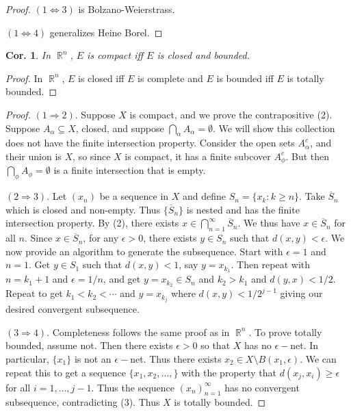 \documentclass[12pt, a4paper]{book}
\DeclareMathOperator{\R}{\mathbb{R}}
\newtheorem{corollary}[theorem]{Cor.}
\theoremstyle{nonumberplain}
\newtheorem{proof}{Proof}
\begin{document}
\begin{proof}
    $(1\Leftrightarrow 3)$ is Bolzano-Weierstrass.

    $(1\Leftrightarrow 4)$ generalizes Heine Borel.
\end{proof}
\begin{corollary}
    In $\R^n$, $E$ is compact iff $E$ is closed and bounded.
\end{corollary}
\begin{proof}
    In $\R^n$, $E$ is closed iff $E$ is complete and $E$ is bounded iff $E$ is totally bounded.
\end{proof}
\begin{proof}
    $(1\Rightarrow 2)$. Suppose $X$ is compact, and we prove the contrapositive (2).
    Suppose $A_\alpha\subseteq X$, closed, and suppose $\bigcap_{\alpha}A_\alpha=\emptyset$. We will
    show this collection does not have the finite intersection property. Consider the open sets $A_\alpha^c$, and their union is
    $X$, so since $X$ is compact, it has a finite subcover $A_\phi^c$. But then $\bigcap_\phi A_\phi=\emptyset$ is a finite
    intersection that is empty.

    $(2\Rightarrow 3)$. Let $(x_n)$ be a sequence in $X$ and define $S_n=\{x_k:k\geq n\}$. Take $\overline{S}_n$ which is closed
    and non-empty. Thus $\{\overline{S}_n\}$ is nested and has the finite intersection property. By (2), there exists
    $x\in\bigcap_{n=1}^\infty\overline{S}_n$. We thus have $x\in\overline{S}_n$ for all $n$. Since $x\in\overline{S}_n$,
    for any $\epsilon>0$, there exists $y\in S_n$ such that $d(x,y)<\epsilon$. We now provide an algorithm to generate the
    subsequence. Start with $\epsilon=1$ and $n=1$. Get $y\in S_1$ such that $d(x,y)<1$, say $y=x_{k_1}$.
    Then repeat with $n=k_1+1$ and $\epsilon=1/n$, and get $y=x_{k_2}\in S_n$ and $k_2>k_1$ and $d(y,x)<1/2$. Repeat to
    get $k_1<k_2<\cdots$ and $y=x_{k_j}$ where $d(x,y)<1/2^{j-1}$ giving our desired convergent subsequence.

    $(3\Rightarrow 4)$. Completeness follows the same proof as in $\R^n$. To prove totally bounded, assume not. Then there exists $\epsilon>0$ so
    that $X$ has no $\epsilon-$net. In particular, $\{x_1\}$ is not an $\epsilon-$net. Thus there exists $x_2\in X\setminus B(x_1,\epsilon)$.
    We can repeat this to get a sequence $\{x_1,x_2,\ldots,\}$ with the property that $d(x_j,x_i)\geq\epsilon$ for all $i=1,\ldots,j-1$.
    Thus the sequence $(x_n)_{n=1}^\infty$ has no convergent subsequence, contradicting (3). Thus $X$ is totally bounded.


\end{proof}
\end{document}
